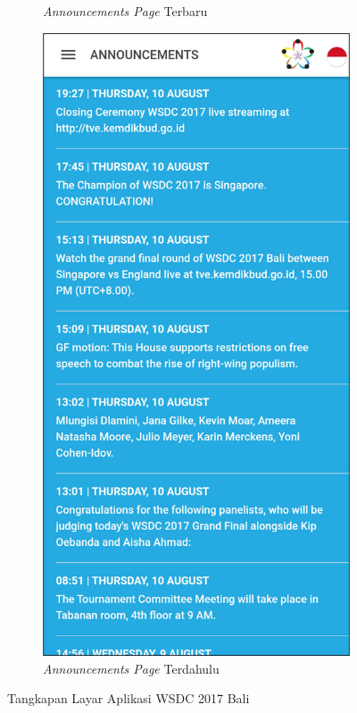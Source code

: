 \begin{figure}[H]
\begin{subfigure}[b]{0.3\textwidth}
         \caption{\textit{Announcements Page} Terbaru}
         \label{fig:ssAnnouncements}
     \end{subfigure}
     \hspace*{0.5in}
     \begin{subfigure}[b]{0.3\textwidth}
         \centering
         \includegraphics[width=\textwidth]{Gambar/AnnouncementsPage.png}
         \caption{\textit{Announcements Page} Terdahulu}
         \label{fig:ssAnnouncementsOld}
     \end{subfigure}
        \caption{Tangkapan Layar Aplikasi WSDC 2017 Bali}
        \label{fig:ssApk1}
\end{figure}


